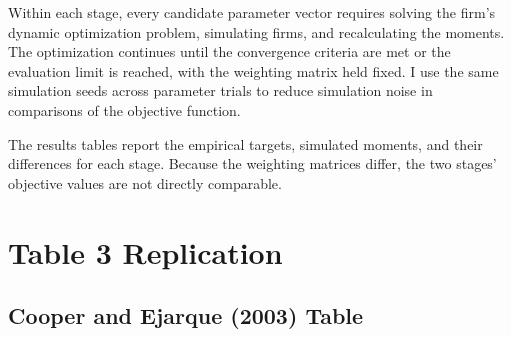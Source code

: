 \documentclass{article}
\begin{document}
Within each stage, every candidate parameter vector requires
solving the firm's dynamic optimization problem, simulating
firms, and recalculating the moments. The optimization continues
until the convergence criteria are met or the evaluation limit
is reached, with the weighting matrix held fixed. I use the
same simulation seeds across parameter trials to reduce
simulation noise in comparisons of the objective function.

The results tables report the empirical targets, simulated
moments, and their differences for each stage. Because the
weighting matrices differ, the two stages' objective values
are not directly comparable.
\begin{table}[H]
    \centering
    \caption{First-stage moments}
    \label{tab:stage1_moments}
        
\end{table}

\begin{table}[H]
    \centering
    \caption{Second-stage moments}
    \label{tab:stage2_moments}
        
\end{table}
\section{Table 3 Replication}      

\subsection{Cooper and Ejarque (2003) Table}
\end{document}
